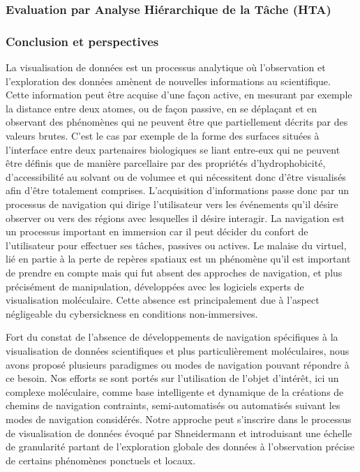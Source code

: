 \subsubsection{Evaluation par Analyse Hiérarchique de la Tâche (HTA)}



\subsubsection{Conclusion et perspectives}

La visualisation de données est un processus analytique où l'observation et l'exploration des données amènent de nouvelles informations au scientifique. Cette information peut être acquise d'une façon active, en mesurant par exemple la distance entre deux atomes, ou de façon passive, en se déplaçant et en observant des phénomènes qui ne peuvent être que partiellement décrits par des valeurs brutes. C'est le cas par exemple de la forme des surfaces situées à l'interface entre deux partenaires biologiques se liant entre-eux qui ne peuvent être définis que de manière parcellaire par des propriétés d'hydrophobicité, d'accessibilité au solvant ou de volumee et qui nécessitent donc d'être visualisés afin d'être totalement comprises. L'acquisition d'informations passe donc par un processus de navigation qui dirige l'utilisateur vers les événements qu'il désire observer ou vers des régions avec lesquelles il désire interagir. La navigation est un processus important en immersion car il peut décider du confort de l'utilisateur pour effectuer ses tâches, passives ou actives. Le malaise du virtuel, lié en partie à la perte de repères spatiaux est un phénomène qu'il est important de prendre en compte mais qui fut absent des approches de navigation, et  plus précisément de manipulation, développées avec les logiciels experts de visualisation moléculaire. Cette absence est principalement due à l'aspect négligeable du cybersickness en conditions non-immersives.

Fort du constat de l'absence de développements de navigation spécifiques à la visualisation de données scientifiques et plus particulièrement moléculaires, nous avons proposé plusieurs paradigmes ou modes de navigation pouvant répondre à ce besoin. Nos efforts se sont portés sur l'utilisation de l'objet d'intérêt, ici un complexe moléculaire, comme base intelligente et dynamique de la créations de chemins de navigation contraints, semi-automatisés ou automatisés suivant les modes de navigation considérés. Notre approche peut s'inscrire dans le processus de visualisation de données évoqué par Shneidermann et introduisant une échelle de granularité partant de l'exploration globale des données à l'observation précise de certains phénomènes ponctuels et locaux.

